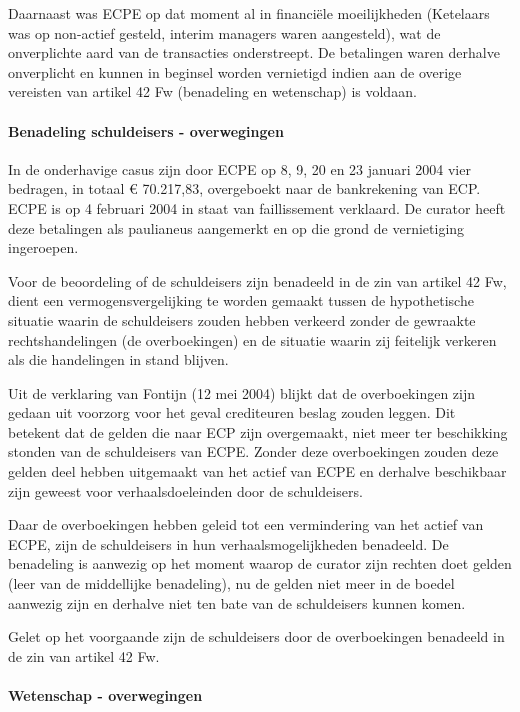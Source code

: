 \documentclass[
  dutch,
  a4paper,
]{article}
\begin{document}
Daarnaast was ECPE op dat moment al in financiële moeilijkheden (Ketelaars was op non-actief gesteld, interim managers waren aangesteld), wat de onverplichte aard van de transacties onderstreept. De betalingen waren derhalve onverplicht en kunnen in beginsel worden vernietigd indien aan de overige vereisten van artikel 42 Fw (benadeling en wetenschap) is voldaan.

\paragraph{Benadeling schuldeisers - overwegingen}\label{benadeling-schuldeisers---overwegingen-51}

In de onderhavige casus zijn door ECPE op 8, 9, 20 en 23 januari 2004 vier bedragen, in totaal € 70.217,83, overgeboekt naar de bankrekening van ECP. ECPE is op 4 februari 2004 in staat van faillissement verklaard. De curator heeft deze betalingen als paulianeus aangemerkt en op die grond de vernietiging ingeroepen.

Voor de beoordeling of de schuldeisers zijn benadeeld in de zin van artikel 42 Fw, dient een vermogensvergelijking te worden gemaakt tussen de hypothetische situatie waarin de schuldeisers zouden hebben verkeerd zonder de gewraakte rechtshandelingen (de overboekingen) en de situatie waarin zij feitelijk verkeren als die handelingen in stand blijven.

Uit de verklaring van Fontijn (12 mei 2004) blijkt dat de overboekingen zijn gedaan uit voorzorg voor het geval crediteuren beslag zouden leggen. Dit betekent dat de gelden die naar ECP zijn overgemaakt, niet meer ter beschikking stonden van de schuldeisers van ECPE. Zonder deze overboekingen zouden deze gelden deel hebben uitgemaakt van het actief van ECPE en derhalve beschikbaar zijn geweest voor verhaalsdoeleinden door de schuldeisers.

Daar de overboekingen hebben geleid tot een vermindering van het actief van ECPE, zijn de schuldeisers in hun verhaalsmogelijkheden benadeeld. De benadeling is aanwezig op het moment waarop de curator zijn rechten doet gelden (leer van de middellijke benadeling), nu de gelden niet meer in de boedel aanwezig zijn en derhalve niet ten bate van de schuldeisers kunnen komen.

Gelet op het voorgaande zijn de schuldeisers door de overboekingen benadeeld in de zin van artikel 42 Fw.

\paragraph{Wetenschap - overwegingen}\label{wetenschap---overwegingen-51}
\end{document}
